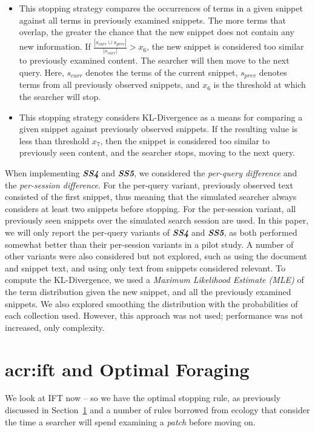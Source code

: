 \begin{itemize}
    \item[\blueboxbold{SS6}] This stopping strategy compares the occurrences of terms in a given snippet against all terms in previously examined snippets. The more terms that overlap, the greater the chance that the new snippet does not contain any new information. If $\frac{|s_{curr} \cup s_{prev}|}{|s_{curr}|} > x_6$, the new snippet is considered too similar to previously examined content. The searcher will then move to the next query. Here, $s_{curr}$ denotes the terms of the current snippet, $s_{prev}$ denotes terms from all previously observed snippets, and $x_6$ is the threshold at which the searcher will stop.
\end{itemize}

\begin{itemize}
    \item[\blueboxbold{SS7}] This stopping strategy considers KL-Divergence as a means for comparing a given snippet against previously observed snippets. If the resulting value is less than threshold $x_7$, then the snippet is considered too similar to previously seen content, and the searcher stops, moving to the next query.
\end{itemize}

When implementing \textbf{\emph{SS4}} and \textbf{\emph{SS5}}, we considered the \emph{per-query difference} and the \emph{per-session difference}. For the per-query variant, previously observed text consisted of the first snippet, thus meaning that the simulated searcher always considers at least two snippets before stopping. For the per-session variant, all previously seen snippets over the simulated search session are used. In this paper, we will only report the per-query variants of \textbf{\emph{SS4}} and \textbf{\emph{SS5}}, as both performed somewhat better than their per-session variants in a pilot study. A number of other variants were also considered but not explored, such as using the document and snippet text, and using only text from snippets considered relevant. To compute the KL-Divergence, we used a \emph{Maximum Likelihood Estimate (MLE)} of the term distribution given the new snippet, and all the previously examined snippets. We also explored smoothing the distribution with the probabilities of each collection used. However, this approach was not used; performance was not increased, only complexity.

\section{\gls{acr:ift} and Optimal Foraging}
We look at IFT now -- so we have the optimal stopping rule, as previously discussed in Section~\ref{} and a number of rules borrowed from ecology that consider the time a searcher will spend examining a \emph{patch} before moving on.

